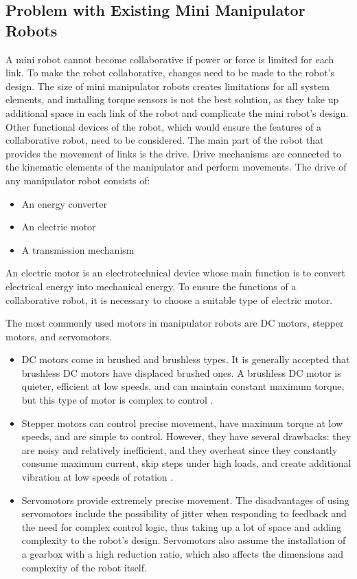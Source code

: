 \subsection{Problem with Existing Mini Manipulator Robots}
A mini robot cannot become collaborative if power or force is limited for each link. To make the robot collaborative, changes need to be made to the robot's design.
The size of mini manipulator robots creates limitations for all system elements, and installing torque sensors is not the best solution, as they take up additional space in each link of the robot and complicate the mini robot's design. Other functional devices of the robot, which would ensure the features of a collaborative robot, need to be considered. The main part of the robot that provides the movement of links is the drive. Drive mechanisms are connected to the kinematic elements of the manipulator and perform movements.
The drive of any manipulator robot consists of:
\begin{itemize}
	\item An energy converter
	\item An electric motor
	\item A transmission mechanism
\end{itemize}

An electric motor is an electrotechnical device whose main function is to convert electrical energy into mechanical energy. To ensure the functions of a collaborative robot, it is necessary to choose a suitable type of electric motor.

The most commonly used motors in manipulator robots are DC motors, stepper motors, and servomotors.
\begin{itemize}
	\item DC motors come in brushed and brushless types. It is generally accepted that brushless DC motors have displaced brushed ones. A brushless DC motor is quieter, efficient at low speeds, and can maintain constant maximum torque, but this type of motor is complex to control \citep{medicaldesignbriefsBrushedVersus}.
	\item Stepper motors can control precise movement, have maximum torque at low speeds, and are simple to control. However, they have several drawbacks: they are noisy and relatively inefficient, and they overheat since they constantly consume maximum current, skip steps under high loads, and create additional vibration at low speeds of rotation \citep{Steppermotorvibrations}.
	\item Servomotors provide extremely precise movement. The disadvantages of using servomotors include the possibility of jitter when responding to feedback and the need for complex control logic, thus taking up a lot of space and adding complexity to the robot's design. Servomotors also assume the installation of a gearbox with a high reduction ratio, which also affects the dimensions and complexity of the robot itself.
\end{itemize}

